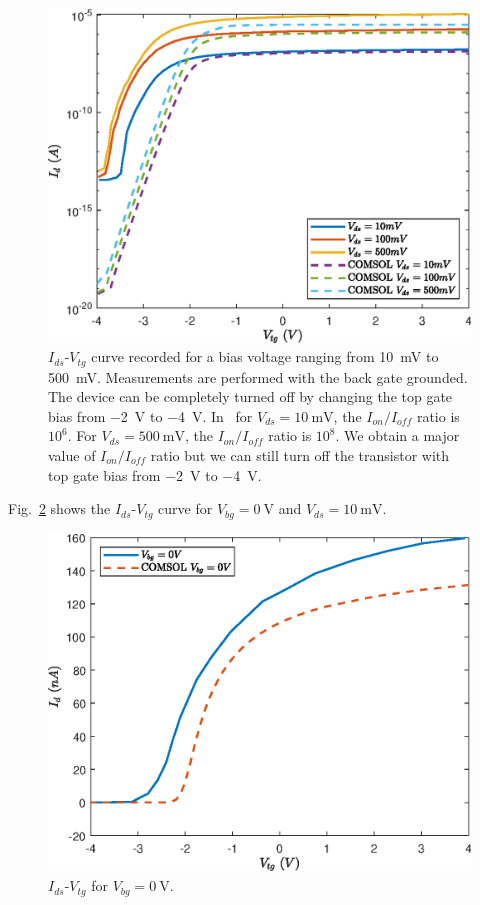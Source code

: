 \documentclass[electronics,article,submit,moreauthors,pdftex]{Definitions/mdpi}
\begin{document}
\begin{figure}[H]
	\centering
	\includegraphics[width=.8\textwidth]{Grafici/Id(Vtg)_HfO2_MoS2_varying_Vds.eps} 
	\caption{$I_{ds}$-$V_{tg}$ curve recorded for a bias voltage ranging from \SI{10}{\milli \volt} to \SI{500}{\milli \volt}. Measurements are performed with the back gate grounded. The device can be completely turned off by changing the top gate bias from \SI{-2}{ \volt} to \SI{-4}{\volt}. In~\cite{Radisavljevic:Si_MoS2} for $V_{ds} = \SI{10}{\milli \volt}$, the $I_{on}/I_{off}$ ratio is $10^6$. For $V_{ds} = \SI{500}{\milli \volt}$, the $I_{on}/I_{off}$ ratio is $10^8$. We obtain a major value of $I_{on}/I_{off}$ ratio but we can still turn off the transistor with top gate bias from \SI{-2}{ \volt} to \SI{-4}{\volt}.}
	\label{fig:Id(Vtg)_HfO2_MoS2_varying_Vds}
\end{figure}

Fig.~\ref{fig:Id(Vtg)_HfO2_MoS2_varying_Vbg} shows the $I_{ds}$-$V_{tg}$ curve for $V_{bg}=\SI{0}{\volt}$ and $V_{ds}=\SI{10}{\milli \volt}$.

\begin{figure}[H]
	\centering
	\includegraphics[width=.7\textwidth]{Grafici/Id(Vtg)_HfO2_MoS2_varying_Vbg.eps} 
	\caption{$I_{ds}$-$V_{tg}$ for $V_{bg} = \SI{0}{\volt}$.}
	\label{fig:Id(Vtg)_HfO2_MoS2_varying_Vbg}
\end{figure}
\end{document}
